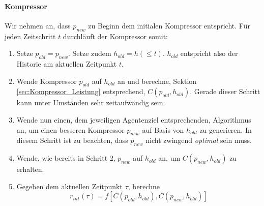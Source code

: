 \paragraph{Kompressor} Wir nehmen an, dass \(p_{new}\) zu Beginn dem initialen Kompressor entspricht. Für jeden Zeitschritt \(t\) durchläuft der Kompressor somit:
\begin{enumerate}
  \item Setze \(p_{old} = p_{new}\). Setze zudem \(h_{old} = h(\leq t)\). \(h_{old}\) entspricht also der Historie am aktuellen Zeitpunkt \(t\).
  \item Wende Kompressor \(p_{old}\) auf \(h_{old}\) an und berechne, Sektion \ref{sec:Kompressor_Leistung} entsprechend, \(C(p_{old},h_{old})\). Gerade dieser Schritt kann unter Umständen sehr zeitaufwändig sein.
  \item Wende nun einen, dem jeweiligen Agentenziel entsprechenden, Algorithmus an, um einen besseren Kompressor \(p_{new}\) auf Basis von \(h_{old}\) zu generieren. In diesem Schritt ist zu beachten, dass \(p_{new}\) nicht zwingend \emph{optimal} sein muss.
  \item Wende, wie bereits in Schritt 2, \(p_{new}\) auf \(h_{old}\) an, um \(C(p_{new},h_{old})\) zu erhalten.
  \item Gegeben dem aktuellen Zeitpunkt \(\tau\), berechne \begin{equation} r_{int}(\tau) = f \left[C(p_{old},h_{old}),C(p_{new},h_{old})\right] \end{equation}
\end{enumerate} \cite[p.~20]{curiosity_schmidhuber}
